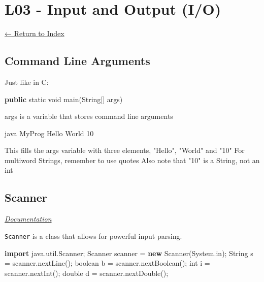 \documentclass[]{article}
\newenvironment{Shaded}{}{}
\newcommand{\BuiltInTok}[1]{#1}
\newcommand{\DataTypeTok}[1]{\textcolor[rgb]{0.56,0.13,0.00}{#1}}
\newcommand{\DecValTok}[1]{\textcolor[rgb]{0.25,0.63,0.44}{#1}}
\newcommand{\FunctionTok}[1]{\textcolor[rgb]{0.02,0.16,0.49}{#1}}
\newcommand{\ImportTok}[1]{#1}
\newcommand{\KeywordTok}[1]{\textcolor[rgb]{0.00,0.44,0.13}{\textbf{#1}}}
\newcommand{\NormalTok}[1]{#1}
\newcommand{\StringTok}[1]{\textcolor[rgb]{0.25,0.44,0.63}{#1}}
\begin{document}
\hypertarget{l03---input-and-output-io}{%
\section{L03 - Input and Output (I/O)}\label{l03---input-and-output-io}}

\protect\hyperlink{table-of-contents}{← Return to Index}

\hypertarget{command-line-arguments}{%
\subsection{Command Line Arguments}\label{command-line-arguments}}

Just like in C:

\begin{Shaded}
\begin{Highlighting}[]
\KeywordTok{public} \DataTypeTok{static} \DataTypeTok{void} \FunctionTok{main}\NormalTok{(}\BuiltInTok{String}\NormalTok{[] args)}
\end{Highlighting}
\end{Shaded}

args is a variable that stores command line arguments

\begin{Shaded}
\begin{Highlighting}[]
\NormalTok{java MyProg Hello World }\DecValTok{10}

\NormalTok{This fills the args variable with three elements, }\StringTok{"Hello"}\NormalTok{, }\StringTok{"World"}\NormalTok{ and }\StringTok{"10"}
\NormalTok{For multiword Strings, remember to use quotes}
\NormalTok{Also note that }\StringTok{"10"}\NormalTok{ is a }\BuiltInTok{String}\NormalTok{, not an }\DataTypeTok{int}
\end{Highlighting}
\end{Shaded}

\hypertarget{scanner}{%
\subsection{Scanner}\label{scanner}}

\emph{\href{https://docs.oracle.com/javase/8/docs/api/java/util/Scanner.html}{Documentation}}

\texttt{Scanner} is a class that allows for powerful input parsing.

\begin{Shaded}
\begin{Highlighting}[]
\KeywordTok{import}\ImportTok{ java.util.Scanner;}
\BuiltInTok{Scanner}\NormalTok{ scanner = }\KeywordTok{new} \BuiltInTok{Scanner}\NormalTok{(}\BuiltInTok{System}\NormalTok{.}\FunctionTok{in}\NormalTok{);}
\BuiltInTok{String}\NormalTok{ s = scanner.}\FunctionTok{nextLine}\NormalTok{();}
\DataTypeTok{boolean}\NormalTok{ b = scanner.}\FunctionTok{nextBoolean}\NormalTok{();}
\DataTypeTok{int}\NormalTok{ i = scanner.}\FunctionTok{nextInt}\NormalTok{();}
\DataTypeTok{double}\NormalTok{ d = scanner.}\FunctionTok{nextDouble}\NormalTok{();}
\end{Highlighting}
\end{Shaded}
\end{document}
